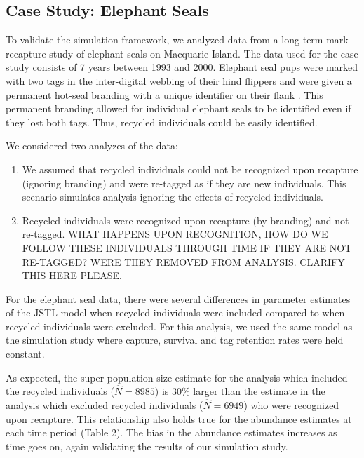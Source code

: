 \documentclass[]{article}
\begin{document}
\subsection{Case Study: Elephant
Seals}\label{case-study-elephant-seals-1}


To validate the simulation framework, we analyzed data from a long-term mark-recapture study of elephant seals on Macquarie Island. The data
used for the case study consists of 7 years between 1993 and 2000.
Elephant seal pups were marked with two tags in the inter-digital
webbing of their hind flippers and were given a permanent hot-seal
branding with a unique identifier on their flank \citep{McMahon:2009}. This
permanent branding allowed for individual elephant seals to be
identified even if they lost both tags. Thus, recycled individuals could
be easily identified.

We considered two analyzes of the data:

\begin{enumerate}
\def\labelenumi{\arabic{enumi}.}
\item
  We assumed that recycled individuals could not be recognized upon
  recapture (ignoring branding) and were re-tagged as if they are new
  individuals. This scenario simulates analysis ignoring the effects of
  recycled individuals.
\item
  Recycled individuals were recognized upon recapture (by branding) and
  not re-tagged. WHAT HAPPENS UPON RECOGNITION, HOW DO WE FOLLOW THESE INDIVIDUALS THROUGH TIME IF THEY ARE NOT RE-TAGGED? WERE THEY REMOVED FROM ANALYSIS.  CLARIFY THIS HERE PLEASE.
\end{enumerate}


For the elephant seal data, there were several differences in parameter
estimates of the JSTL model when recycled individuals were included
compared to when recycled individuals were excluded. For this analysis, we used the same model as the simulation study where capture, survival and tag retention rates were held constant.  

As expected, the
super-population size estimate for the analysis which included the
recycled individuals ($\hat{N}=8985$) is 30\% larger than the estimate in the analysis
which excluded recycled individuals ($\hat{N}=6949$) who were recognized upon recapture. This relationship also holds true for the abundance estimates
at each time period (Table 2). The bias in the abundance estimates increases
 as time goes on, again validating the results of our
simulation study.
\end{document}
